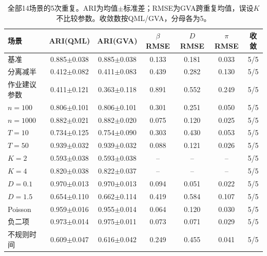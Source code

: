 \begin{table}[H]\centering\small
\caption{全部14场景的5次重复。ARI为均值$\pm$标准差；RMSE为GVA跨重复均值，误设$K$不比较参数。收敛数按QML/GVA，分母各为5。}
\begin{tabular}{lcccccc}\toprule
场景 & ARI(QML) & ARI(GVA) & $\beta$ RMSE & $D$ RMSE & $\pi$ RMSE & 收敛\\\midrule
基准 & 0.885$\pm$0.038 & 0.885$\pm$0.038 & 0.133 & 0.181 & 0.033 & 5/5 \\
分离减半 & 0.412$\pm$0.082 & 0.411$\pm$0.083 & 0.439 & 0.282 & 0.130 & 5/5 \\
作业建议参数 & 0.411$\pm$0.121 & 0.363$\pm$0.118 & 0.891 & 0.552 & 0.249 & 5/5 \\
$n=100$ & 0.806$\pm$0.101 & 0.806$\pm$0.101 & 0.301 & 0.251 & 0.050 & 5/5 \\
$n=1000$ & 0.882$\pm$0.021 & 0.882$\pm$0.020 & 0.075 & 0.120 & 0.025 & 5/5 \\
$T=10$ & 0.734$\pm$0.125 & 0.754$\pm$0.090 & 0.303 & 0.430 & 0.053 & 5/5 \\
$T=50$ & 0.939$\pm$0.032 & 0.939$\pm$0.032 & 0.088 & 0.121 & 0.026 & 5/5 \\
$K=2$ & 0.593$\pm$0.038 & 0.593$\pm$0.038 & -- & -- & -- & 5/5 \\
$K=4$ & 0.820$\pm$0.038 & 0.822$\pm$0.037 & -- & -- & -- & 5/5 \\
$D=0.1$ & 0.970$\pm$0.013 & 0.970$\pm$0.013 & 0.094 & 0.051 & 0.022 & 5/5 \\
$D=1.5$ & 0.654$\pm$0.110 & 0.662$\pm$0.114 & 0.419 & 0.584 & 0.107 & 5/5 \\
Poisson & 0.959$\pm$0.016 & 0.955$\pm$0.014 & 0.064 & 0.120 & 0.030 & 5/5 \\
负二项 & 0.973$\pm$0.014 & 0.975$\pm$0.011 & 0.073 & 0.071 & 0.029 & 5/5 \\
不规则时间 & 0.609$\pm$0.047 & 0.616$\pm$0.042 & 0.249 & 0.455 & 0.041 & 5/5 \\
\bottomrule\end{tabular}\end{table}
